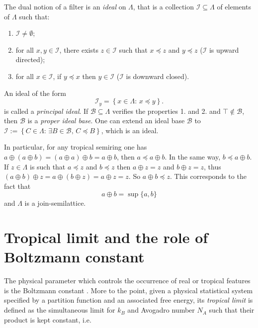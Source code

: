 \documentclass[11pt,british,reqno]{article}
\numberwithin{equation}{section}
\numberwithin{figure}{section}
\numberwithin{table}{section}
\theoremstyle{definition}
\theoremstyle{definition}
\theoremstyle{plain}
\theoremstyle{plain}
\theoremstyle{remark}
\theoremstyle{plain}
\numberwithin{equation}{section}
\numberwithin{figure}{section}
\numberwithin{table}{section}
\theoremstyle{plain}
\begin{document}
The dual notion of a filter is an \textit{ideal} on $\Lambda$, that is a collection $\mathcal{I}\subseteq\Lambda$
of elements of $\Lambda$ such that: 
\begin{enumerate}
\item $\mathcal{I}\neq\emptyset$; 
\item for all $x,y\in\mathcal{I}$, there exists $z\in\mathcal{I}$ such
that $x\preceq z$ and $y\preceq z$ ($\mathcal{I}$ is upward directed); 
\item for all $x\in\mathcal{I}$, if $y\preceq x$ then $y\in\mathcal{I}$
($\mathcal{I}$ is downward closed). 
\end{enumerate}
An ideal of the form 
\begin{equation}
\mathcal{I}_{y}=\left\{ x\in\Lambda:\,x\preceq y\right\} .\label{eq: principal ideal}
\end{equation}
is called a \textit{principal ideal}. If $\mathcal{B}\subseteq\Lambda$
verifies the properties 1. and 2. and $\top\notin\mathcal{B}$, then $\mathcal{B}$
is a \textit{proper ideal base}. One can extend an ideal base $\mathcal{B}$
to $\mathcal{I}:=\left\{ C\in\Lambda:\,\exists B\in\mathcal{B},\,C\preceq B\right\} $,
which is an ideal. 

In particular, for any tropical semiring one has $a\oplus(a\oplus b)=(a\oplus a)\oplus b=a\oplus b$, then $a\preceq a\oplus b$. In the same way, $b\preceq a\oplus b$.
If $z\in\Lambda$ is such that $a\preceq z$ and $b\preceq z$ then
$a\oplus z=z$ and $b\oplus z=z$, thus $(a\oplus b)\oplus z=a\oplus(b\oplus z)=a\oplus z=z$. So $a\oplus b\preceq z$. This corresponds to the fact that 
\begin{equation}
a\oplus b=\sup\{a,b\}\label{eq: sum sup}
\end{equation}
and $\Lambda$ is a join-semilattice. 

\section{\label{sec: Tropical limit and the role of Boltzmann constant} Tropical
limit and the role of Boltzmann constant} 

The physical parameter which controls the occurrence of real or tropical
features is the Boltzmann constant \cite{AK2015}. More to the point, given a physical statistical system specified by a partition function and an associated free energy, its \emph{tropical limit} is defined as the simultaneous limit for $k_{B}$ and Avogadro number $N_{A}$ such that their product is kept constant, i.e. 
\end{document}
